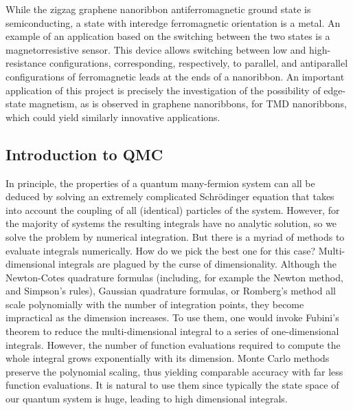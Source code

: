 While the zigzag graphene nanoribbon antiferromagnetic ground state is semiconducting, a state with interedge ferromagnetic orientation is a metal.
An example of an application based on the switching between the two states is a magnetorresistive sensor.
This device allows switching between low and high-resistance configurations, corresponding, respectively, to parallel, and antiparallel configurations of ferromagnetic leads at the ends of a nanoribbon.
An important application of this project is precisely the investigation of the possibility of edge-state magnetism, as is observed in graphene nanoribbons, for TMD nanoribbons, which could yield similarly innovative applications.


\subsection{Introduction to \acl{QMC}}

In principle, the properties of a quantum many-fermion system can all be deduced by solving an extremely complicated Schr\"odinger equation that takes into account the coupling of all (identical) particles of the system.
However, for the majority of systems the resulting integrals have no analytic solution, so we solve the problem by numerical integration.
But there is a myriad of methods to evaluate integrals numerically.
How do we pick the best one for this case? 
Multi-dimensional integrals are plagued by the curse of dimensionality.
Although the Newton-Cotes quadrature formulas (including, for example the Newton method, and Simpson's rules), Gaussian quadrature formulas, or Romberg's method all scale polynomially with the number of integration points, they become impractical as the dimension increases.
To use them, one would invoke Fubini's theorem to reduce the multi-dimensional integral to a series of one-dimensional integrals.
However, the number of function evaluations required to compute the whole integral grows exponentially with its dimension.
Monte Carlo methods preserve the polynomial scaling, thus yielding comparable accuracy with far less function evaluations. It is natural to use them since typically the state space of our quantum system is huge, leading to high dimensional integrals.

